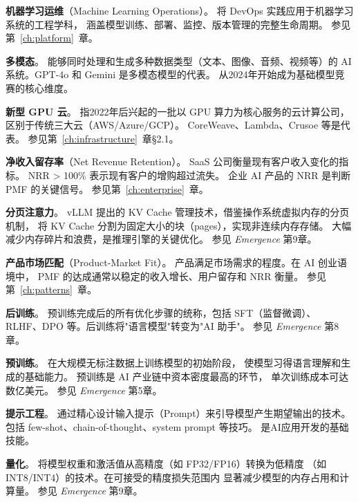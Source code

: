 \begin{description}[style=nextline, leftmargin=2.5cm, labelwidth=2.3cm, font=\bfseries]
\item[MLOps]
\textbf{机器学习运维}（Machine Learning Operations）。
将 DevOps 实践应用于机器学习系统的工程学科，
涵盖模型训练、部署、监控、版本管理的完整生命周期。
参见第~\ref{ch:platform}~章。

\item[Multimodal]
\textbf{多模态}。
能够同时处理和生成多种数据类型（文本、图像、音频、视频等）的
AI 系统。GPT-4o 和 Gemini 是多模态模型的代表。
从2024年开始成为基础模型竞赛的核心维度。

\item[Neocloud]
\textbf{新型 GPU 云}。
指2022年后兴起的一批以 GPU 算力为核心服务的云计算公司，
区别于传统三大云（AWS/Azure/GCP）。
CoreWeave、Lambda、Crusoe 等是代表。
参见第~\ref{ch:infrastructure}~章§2.1。

\item[NRR]
\textbf{净收入留存率}（Net Revenue Retention）。
SaaS 公司衡量现有客户收入变化的指标。
NRR > 100\% 表示现有客户的增购超过流失。
企业 AI 产品的 NRR 是判断 PMF 的关键信号。
参见第~\ref{ch:enterprise}~章。

\item[PagedAttention]
\textbf{分页注意力}。
vLLM 提出的 KV Cache 管理技术，借鉴操作系统虚拟内存的分页机制，
将 KV Cache 分割为固定大小的块（pages），实现非连续内存存储。
大幅减少内存碎片和浪费，是推理引擎的关键优化。
参见 \textit{Emergence} 第9章。

\item[PMF]
\textbf{产品市场匹配}（Product-Market Fit）。
产品满足市场需求的程度。在 AI 创业语境中，
PMF 的达成通常以稳定的收入增长、用户留存和 NRR 衡量。
参见第~\ref{ch:patterns}~章。

\item[Post-training]
\textbf{后训练}。
预训练完成后的所有优化步骤的统称，包括 SFT（监督微调）、
RLHF、DPO 等。后训练将"语言模型"转变为"AI 助手"。
参见 \textit{Emergence} 第8章。

\item[Pretraining]
\textbf{预训练}。
在大规模无标注数据上训练模型的初始阶段，
使模型习得语言理解和生成的基础能力。
预训练是 AI 产业链中资本密度最高的环节，
单次训练成本可达数亿美元。
参见 \textit{Emergence} 第5章。

\item[Prompt Engineering]
\textbf{提示工程}。
通过精心设计输入提示（Prompt）来引导模型产生期望输出的技术。
包括 few-shot、chain-of-thought、system prompt 等技巧。
是AI应用开发的基础技能。

\item[Quantization]
\textbf{量化}。
将模型权重和激活值从高精度（如 FP32/FP16）转换为低精度
（如 INT8/INT4）的技术。在可接受的精度损失范围内
显著减少模型的内存占用和计算量。
参见 \textit{Emergence} 第9章。


\end{description}
